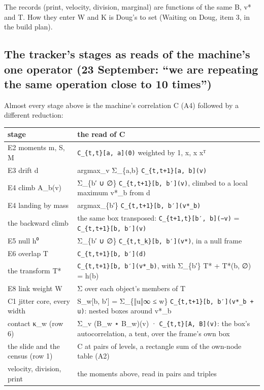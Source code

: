 The records (print, velocity, division, marginal) are functions of the same B, v* and T. How they enter W and K is Doug's to set (Waiting on Doug, item 3, in the build plan).

\subsection{\texorpdfstring{The tracker's stages as reads of the machine's one operator (23 September: “we are repeating the same operation close to 10 times”)}{The tracker's stages as reads of the machine's one operator (23 September: "we are repeating the same operation close to 10 times")}}

Almost every stage above is the machine's correlation C (A4) followed by a different reduction:

{\small
\setlength{\tabcolsep}{6pt}
\begin{longtable}{>{\RaggedRight\arraybackslash}p{}>{\RaggedRight\arraybackslash}p{}}
\toprule
stage & the read of C \\
\midrule
\endhead
E2 moments m, S, M & \texttt{C\_\allowbreak{}\{t,t\}[a, a](0)} weighted by 1, x, x xᵀ \\
E3 drift d & argmax\_\allowbreak{}v Σ\_\allowbreak{}\{a,b\} \texttt{C\_\allowbreak{}\{t,t+1\}[a, b](v)} \\
E4 climb A\_\allowbreak{}b(v) & Σ\_\allowbreak{}\{b′ ∪ ∅\} \texttt{C\_\allowbreak{}\{t,t+1\}[b, b′](v)}, climbed to a local maximum v*\_\allowbreak{}b from d \\
E4 landing by mass & argmax\_\allowbreak{}\{b′\} \texttt{C\_\allowbreak{}\{t,t+1\}[b, b′](v*\_\allowbreak{}b)} \\
the backward climb & the same box transposed: \texttt{C\_\allowbreak{}\{t+1,t\}[b′, b](−v)} = \texttt{C\_\allowbreak{}\{t,t+1\}[b, b′](v)} \\
E5 null h⁰ & Σ\_\allowbreak{}\{b′ ∪ ∅\} \texttt{C\_\allowbreak{}\{t,t\_\allowbreak{}k\}[b, b′](v*)}, in a null frame \\
E6 overlap T & \texttt{C\_\allowbreak{}\{t,t+1\}[b, b′](d)} \\
the transform T* & \texttt{C\_\allowbreak{}\{t,t+1\}[b, b′](v*\_\allowbreak{}b)}, with Σ\_\allowbreak{}\{b′\} T* + T*(b, ∅) = h(b) \\
E8 link weight W & Σ over each object's members of T \\
C1 jitter core, every width & S\_\allowbreak{}w[b, b′] = Σ\_\allowbreak{}\{‖u‖∞ ≤ w\} \texttt{C\_\allowbreak{}\{t,t+1\}[b, b′](v*\_\allowbreak{}b + u)}: nested boxes around v*\_\allowbreak{}b \\
contact κ\_\allowbreak{}w (row 6) & Σ\_\allowbreak{}v (B\_\allowbreak{}w ⋆ B\_\allowbreak{}w)(v) · \texttt{C\_\allowbreak{}\{t,t\}[A, B](v)}: the box's autocorrelation, a tent, over the frame's own box \\
the slide and the census (row 1) & C at pairs of levels, a rectangle sum of the own-node table (A2) \\
velocity, division, print & the moments above, read in pairs and triples \\
\bottomrule
\end{longtable}
}

